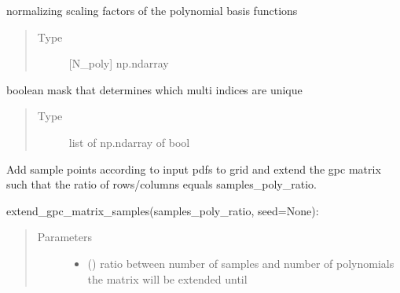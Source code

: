 \documentclass[letterpaper,10pt,english,openany,oneside]{sphinxmanual}
\begin{document}
\begin{fulllineitems}
\begin{fulllineitems}
\begin{quote}
\begin{description}
\end{description}\end{quote}

\end{fulllineitems}


\begin{fulllineitems}
\label{\detokenize{pygpc:pygpc.gpc.gPC.poly_norm_basis}}
normalizing scaling factors of the polynomial basis functions
\begin{quote}\begin{description}
\item[{Type}] \leavevmode
{[}N\_poly{]} np.ndarray

\end{description}\end{quote}

\end{fulllineitems}


\begin{fulllineitems}
\label{\detokenize{pygpc:pygpc.gpc.gPC.sobol_idx_bool}}
boolean mask that determines which multi indices are unique
\begin{quote}\begin{description}
\item[{Type}] \leavevmode
list of np.ndarray of bool

\end{description}\end{quote}

\end{fulllineitems}


\begin{fulllineitems}
\label{\detokenize{pygpc:pygpc.gpc.gPC.extend_random_grid}}
Add sample points according to input pdfs to grid and extend the gpc matrix such that the ratio of
rows/columns equals samples\_poly\_ratio.

extend\_gpc\_matrix\_samples(samples\_poly\_ratio, seed=None):
\begin{quote}\begin{description}
\item[{Parameters}] \leavevmode\begin{itemize}
\item {} 
 () \textendash{} ratio between number of samples and number of polynomials the matrix will be extended until


\end{itemize}
\end{description}
\end{quote}
\end{fulllineitems}
\end{fulllineitems}
\end{document}
